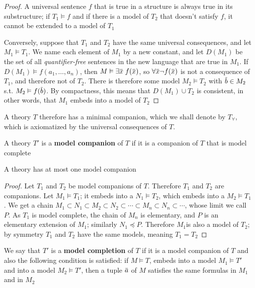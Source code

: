 \documentclass[11pt]{article}
\begin{document}
\begin{proof}
A universal sentence \(f\) that is true in a structure is always true in its substructure;
if \(T_1\vDash f\) and if there is a model of \(T_2\) that doesn't satisfy \(f\), it cannot be extended
to a model of \(T_1\)

Conversely, suppose that \(T_1\) and \(T_2\) have the same universal consequences, and
let \(M_1\vDash T_1\). We name each element of \(M_1\) by a new constant, and let \(D(M_1)\) be the set
of all \emph{quantifier-free} sentences in the new language that are true in \(M_1\).
If \(D(M_1)\vDash f(a_1,\dots,a_n)\), then \(M\vDash\exists\barx\;f(\barx)\), so \(\forall\barx\neg f(\barx)\) is not a
consequence of \(T_1\), and therefore not of \(T_2\). There is therefore some model \(M_2\vDash T_2\)
with \(\barb\in M_2\) s.t. \(M_2\vDash f(\barb)\). By compactness, this means that \(D(M_1)\cup T_2\) is
consistent, in other words, that \(M_1\) embeds into a model of \(T_2\)
\end{proof}

A theory \(T\) therefore has a minimal companion, which we shall denote by \(T_\forall\), which is
axiomatized by the universal consequences of \(T\).

A theory \(T'\) is a \textbf{model companion} of \(T\) if it is a companion of \(T\) that is model complete

\begin{theorem}[]
A theory has at most one model companion
\end{theorem}

\begin{proof}
Let \(T_1\) and \(T_2\) be model companions of \(T\). Therefore \(T_1\) and \(T_2\) are companions.
Let \(M_1\vDash T_1\); it embeds into a \(N_1\vDash T_2\), which embeds into a \(M_2\vDash T_1\). We get a chain
\(M_1\subset N_1\subset M_2\subset N_2\subset\cdots\subset M_n\subset N_n\subset\cdots\), whose limit we call \(P\). As \(T_1\) is model complete, the
chain of \(M_n\) is elementary, and \(P\) is an elementary extension of \(M_1\);
similarly \(N_1\preceq P\). Therefore \(M_1\)is also a model of \(T_2\); by symmetry \(T_1\) and \(T_2\)
have the same models, meaning \(T_1=T_2\)
\end{proof}

We say that \(T'\) is a \textbf{model completion} of \(T\) if it is a model companion of \(T\) and also
the following condition is satisfied: if \(M\vDash T\), embeds into a model \(M_1\vDash T'\) and into a
model \(M_2\vDash T'\), then a tuple \(\bara\) of \(M\) satisfies the same formulas in \(M_1\) and in \(M_2\)
\end{document}
